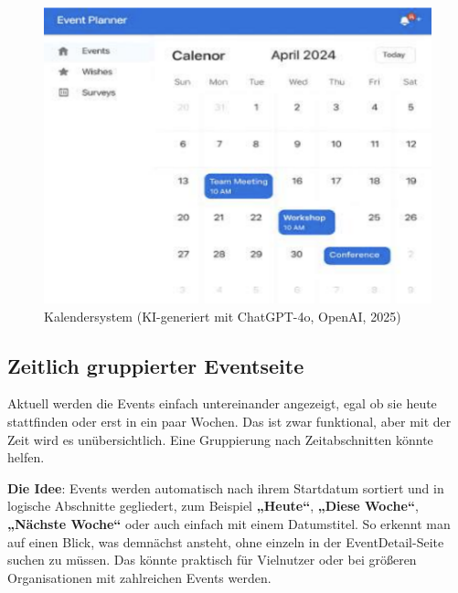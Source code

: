 \documentclass[a4paper,12pt]{article}
\begin{document}
\begin{figure}[H]
    \centering
    \includegraphics[width=1\textwidth]{Abbildungen/kalenderansicht.png}
    \caption{Kalendersystem (KI-generiert mit ChatGPT-4o, OpenAI, 2025)}
    \label{fig:kalenderansicht}
\end{figure}

\newpage


\subsection{Zeitlich gruppierter Eventseite}

Aktuell werden die Events einfach untereinander angezeigt, egal ob sie heute stattfinden oder erst in ein paar Wochen. Das ist zwar funktional, aber mit der Zeit wird es unübersichtlich. Eine Gruppierung nach Zeitabschnitten könnte helfen.

\textbf{Die Idee}: Events werden automatisch nach ihrem Startdatum sortiert und in logische Abschnitte gegliedert, zum Beispiel \textbf{„Heute“}, \textbf{„Diese Woche“}, \textbf{„Nächste Woche“} oder auch einfach mit einem Datumstitel. So erkennt man auf einen Blick, was demnächst ansteht, ohne einzeln in der EventDetail-Seite suchen zu müssen. Das könnte praktisch für Vielnutzer oder bei größeren Organisationen mit zahlreichen Events werden.
\end{document}
